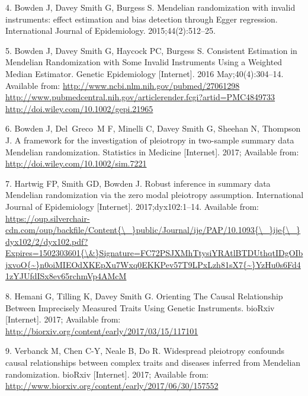 \documentclass[]{article}
\begin{document}
\hypertarget{ref-Bowden2015}{}
4. Bowden J, Davey Smith G, Burgess S. Mendelian randomization with
invalid instruments: effect estimation and bias detection through Egger
regression. International Journal of Epidemiology. 2015;44(2):512--25.

\hypertarget{ref-Bowden2016b}{}
5. Bowden J, Davey Smith G, Haycock PC, Burgess S. Consistent Estimation
in Mendelian Randomization with Some Invalid Instruments Using a
Weighted Median Estimator. Genetic Epidemiology {[}Internet{]}. 2016
May;40(4):304--14. Available from:
\href{http://www.ncbi.nlm.nih.gov/pubmed/27061298\%20http://www.pubmedcentral.nih.gov/articlerender.fcgi?artid=PMC4849733\%20http://doi.wiley.com/10.1002/gepi.21965}{http://www.ncbi.nlm.nih.gov/pubmed/27061298 http://www.pubmedcentral.nih.gov/articlerender.fcgi?artid=PMC4849733 http://doi.wiley.com/10.1002/gepi.21965}

\hypertarget{ref-Bowden2017}{}
6. Bowden J, Del~Greco~M F, Minelli C, Davey Smith G, Sheehan N,
Thompson J. A framework for the investigation of pleiotropy in
two-sample summary data Mendelian randomization. Statistics in Medicine
{[}Internet{]}. 2017; Available from:
\url{http://doi.wiley.com/10.1002/sim.7221}

\hypertarget{ref-Hartwig2017a}{}
7. Hartwig FP, Smith GD, Bowden J. Robust inference in summary data
Mendelian randomization via the zero modal pleiotropy assumption.
International Journal of Epidemiology {[}Internet{]}. 2017;dyx102:1--14.
Available from:
\href{https://oup.silverchair-cdn.com/oup/backfile/Content\%7B/_\%7Dpublic/Journal/ije/PAP/10.1093\%7B/_\%7Dije\%7B/_\%7Ddyx102/2/dyx102.pdf?Expires=1502303601\%7B/\&\%7DSignature=FC72PSJXMhTtysiYRAtlBTDUthqtIDgOIbjxvoO\%7B~\%7Dn0oiMIEOdXKEpXu7Wxq0EKKPev57T9LPxLzh81sX7\%7B~\%7DYzHu0s6Fd41zYJUfdISx8ev65rchmVp4AMcM}{https://oup.silverchair-cdn.com/oup/backfile/Content\{\textbackslash{}\_\}public/Journal/ije/PAP/10.1093\{\textbackslash{}\_\}ije\{\textbackslash{}\_\}dyx102/2/dyx102.pdf?Expires=1502303601\{\textbackslash{}\&\}Signature=FC72PSJXMhTtysiYRAtlBTDUthqtIDgOIbjxvoO\{\textasciitilde{}\}n0oiMIEOdXKEpXu7Wxq0EKKPev57T9LPxLzh81sX7\{\textasciitilde{}\}YzHu0s6Fd41zYJUfdISx8ev65rchmVp4AMcM}

\hypertarget{ref-Hemani2017}{}
8. Hemani G, Tilling K, Davey Smith G. Orienting The Causal Relationship
Between Imprecisely Measured Traits Using Genetic Instruments. bioRxiv
{[}Internet{]}. 2017; Available from:
\url{http://biorxiv.org/content/early/2017/03/15/117101}

\hypertarget{ref-Verbanck2017}{}
9. Verbanck M, Chen C-Y, Neale B, Do R. Widespread pleiotropy confounds
causal relationships between complex traits and diseases inferred from
Mendelian randomization. bioRxiv {[}Internet{]}. 2017; Available from:
\url{http://www.biorxiv.org/content/early/2017/06/30/157552}
\end{document}
